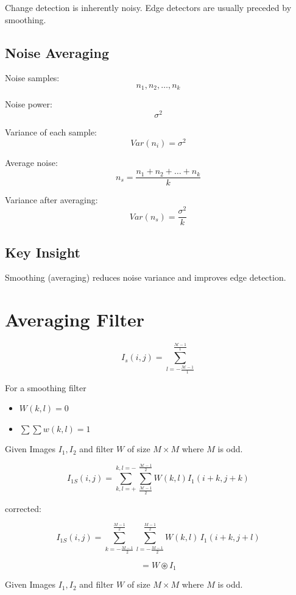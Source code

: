 \documentclass[11pt]{article}
\theoremstyle{definition}
\begin{document}
Change detection is inherently noisy. Edge detectors are usually preceded by smoothing.

\subsection*{Noise Averaging}

Noise samples: 
\[
n_1, n_2, \ldots, n_k
\]

Noise power: 
\[
\sigma^2
\]

Variance of each sample: 
\[
Var(n_i) = \sigma^2
\]

Average noise: 
\[
n_s = \frac{n_1 + n_2 + \ldots + n_k}{k}
\]

Variance after averaging:
\[
Var(n_s) = \frac{\sigma^2}{k}
\]

\subsection*{Key Insight}

Smoothing (averaging) reduces noise variance and improves edge detection.


\section{Averaging Filter}
\[
I_{s} (i, j) = \sum_{l = -\frac{\mathcal{M} - 1}{1}}^{\frac{\mathcal{M} - 1}{1}}
\]

For a smoothing filter

\begin{itemize}
    \item [A.] $W(k,l) = 0$
    \item [B.] $\sum \sum w(k, l) = 1$
\end{itemize}



Given Images $I_1, I_2$ and filter $W$ of size $M\times M$ where $M$ is odd.

\[
I_{1S} (i, j) = \sum_{k,l=+}^{k,l=-}\sum_{\frac{\mathcal{M} - 1}{2}}^{\frac{\mathcal{M} - 1}{2}}W(k,l) I_1 (i+k, j+k)
\]

corrected:

\[
I_{1S}(i,j) = \sum_{k=-\frac{M-1}{2}}^{\frac{M-1}{2}}
\sum_{l=-\frac{M-1}{2}}^{\frac{M-1}{2}}
W(k,l)\, I_1(i+k, j+l)
\]

\[
= W \circledast I_1
\]






Given Images $I_1, I_2$ and filter $W$ of size $M\times M$ where $M$ is odd.
\end{document}
